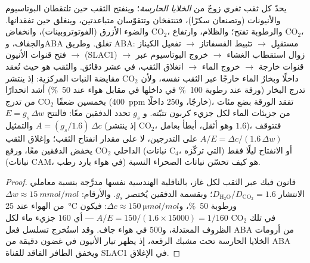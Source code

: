 \begin{proposition}[الثغر صمّامًا]\label{prop:b3:plant-molecular-physiology:stomata}
يحدّ كل ثقب ثغري زوجٌ من \emph{الخلايا الحارسة}؛ وينفتح
الثقب حين تلتقطان البوتاسيوم والأنيونات (وتصنعان سكرًا)،
فتنتفخان وتتقوّسان متباعدتين، وينغلق حين تفقدانها. والضوء
الأزرق (الفوتوتروبينات)، وانخفاض CO$_{2}$، والرطوبة تفتح؛
والظلام، وارتفاع CO$_{2}$، والجفاف، وABA تغلق. وطريق ABA:
مستقبِل $\to$ تثبيط الفسفاتاز $\to$
تفعيل الكيناز $\to$ فتح قنوات الأنيون (SLAC1) $\to$ زوال
استقطاب الغشاء $\to$ خروج البوتاسيوم عبر قنوات خارجة $\to$
خروج الماء $\to$ انغلاق الثقب، في عشر دقائق. والثقب هو حيث
تُعقد مقايضة النبات المركزية: إذ ينتشر CO$_{2}$ داخلًا
وبخارُ الماء خارجًا عبر الثقب نفسه، ولأن تدرج البخار (ورقة
عند رطوبة \qty{100}{\%} في داخلها في مقابل هواء عند
\qty{50}{\%}) أشد انحدارًا من تدرج CO$_{2}$ بخمسين ضعفًا
(\qty{400}{ppm} خارجًا، و\qty{250}{} داخلًا)، تفقد الورقة بضع
مئات من جزيئات الماء لكل جزيء كربون تثبّته. و\emph{} $g_{s}$ تحدد الدفقين معًا: فالنتح $E = g_{s}\,\Delta w$
والتمثيل $A = (g_{s}/1.6)\,\Delta c$ (إذ ينتشر CO$_{2}$، وهو
أثقل، أبطأ بعامل $1.6$)، فتتوقف \emph{}
$A/E = \Delta c/(1.6\,\Delta w)$ على التدرجين، لا على مقدار
انفتاح الثقب؛ وإغلاق الثقب يخفض الدفقين معًا، ورفع CO$_{2}$
الداخلي (نباتات C$_{4}$، التي تركّزه) أو الانفتاح ليلًا فقط
(نباتات CAM، في هواء بارد رطب) هو كيف تحسّن نباتات الصحراء
النسبة.
\end{proposition}
\begin{proof}
قانون فيك عبر الثقب لكل غاز، بالناقلية الهندسية نفسها مدرَّجة
بنسبة معاملي الانتشار
$D_{\mathrm{H_2O}}/D_{\mathrm{CO_2}} = 1.6$؛ وبقسمة الدفقين
يُختصر $g_{s}$. والأرقام: $\Delta w \approx \qty{15}{mmol/mol}$ من الهواء
عند \qty{25}{\celsius} ورطوبة \qty{50}{\%}، و$\Delta c \approx
\qty{150}{\micro mol/mol}$: فيكون $A/E = 150/(1.6\times\num{15000}) = 1/160$
--- أي $160$ جزيء ماء لكل CO$_{2}$ في تلك الظروف المعتدلة،
و$500$ في هواء جاف. وقد استُخرج تسلسل فعل ABA من أرومات
الخلايا الحارسة تحت مشبك الرقعة، إذ يظهر تيار الأنيون في
غضون دقيقة من ABA ويخفق الطافر الفاقد للقناة SLAC1 في الإغلاق.
\end{proof}

